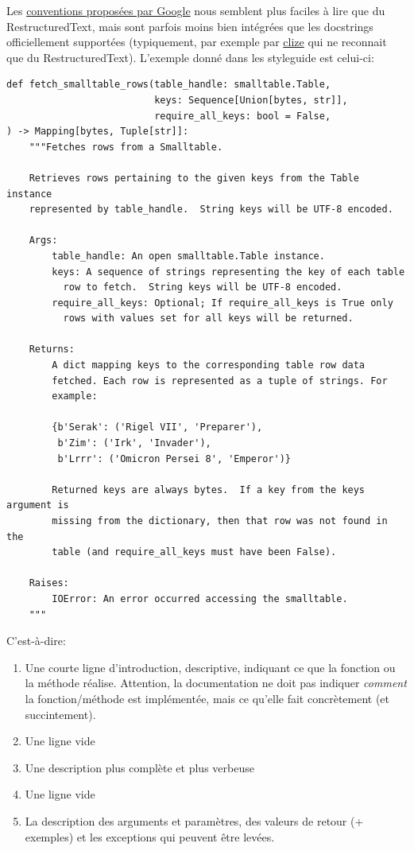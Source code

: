 \documentclass[11pt]{amsbook}
\begin{document}
Les \href{https://google.github.io/styleguide/pyguide.html#38-comments-and-docstrings}{conventions proposées par Google} nous semblent  plus faciles à lire que du RestructuredText, mais sont parfois moins bien intégrées que les docstrings officiellement supportées (typiquement, par exemple par \href{https://clize.readthedocs.io/en/stable/}{clize} qui ne reconnait que du RestructuredText).
L’exemple donné dans les styleguide est celui-ci:


\begin{verbatim}
def fetch_smalltable_rows(table_handle: smalltable.Table,
                          keys: Sequence[Union[bytes, str]],
                          require_all_keys: bool = False,
) -> Mapping[bytes, Tuple[str]]:
    """Fetches rows from a Smalltable.

    Retrieves rows pertaining to the given keys from the Table instance
    represented by table_handle.  String keys will be UTF-8 encoded.

    Args:
        table_handle: An open smalltable.Table instance.
        keys: A sequence of strings representing the key of each table
          row to fetch.  String keys will be UTF-8 encoded.
        require_all_keys: Optional; If require_all_keys is True only
          rows with values set for all keys will be returned.

    Returns:
        A dict mapping keys to the corresponding table row data
        fetched. Each row is represented as a tuple of strings. For
        example:

        {b'Serak': ('Rigel VII', 'Preparer'),
         b'Zim': ('Irk', 'Invader'),
         b'Lrrr': ('Omicron Persei 8', 'Emperor')}

        Returned keys are always bytes.  If a key from the keys argument is
        missing from the dictionary, then that row was not found in the
        table (and require_all_keys must have been False).

    Raises:
        IOError: An error occurred accessing the smalltable.
    """
\end{verbatim}

C’est-à-dire:


\begin{enumerate}

\item{Une courte ligne d’introduction, descriptive, indiquant ce que la fonction ou la méthode réalise. Attention, la documentation ne doit pas indiquer \emph{comment} la fonction/méthode est implémentée, mais ce qu’elle fait concrètement (et succintement).}

\item{Une ligne vide}

\item{Une description plus complète et plus verbeuse}

\item{Une ligne vide}

\item{La description des arguments et paramètres, des valeurs de retour (+ exemples) et les exceptions qui peuvent être levées.}

\end{enumerate}
\end{document}
